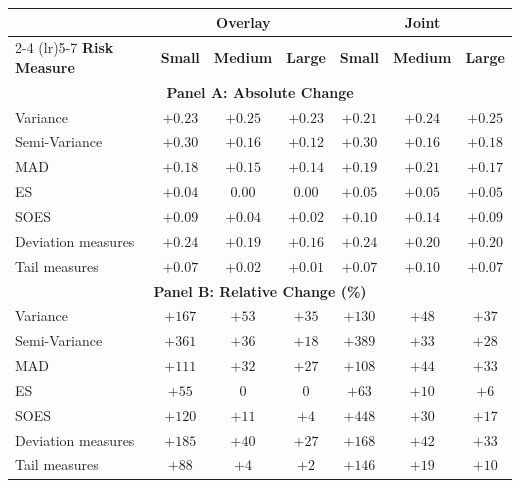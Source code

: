 \begin{table}[htbp]
  \centering
  \setlength{\tabcolsep}{8pt}
  \begin{tabular}{l*{6}{c}}
    \toprule
                          & \multicolumn{3}{c}{\textbf{Overlay}}             & \multicolumn{3}{c}{\textbf{Joint}} \\
    \cmidrule(lr){2-4} \cmidrule(lr){5-7}
    \textbf{Risk Measure} & \textbf{Small} & \textbf{Medium} & \textbf{Large} & \textbf{Small} & \textbf{Medium} & \textbf{Large} \\
    \midrule
    \multicolumn{7}{c}{\textbf{Panel A: Absolute Change}} \\
    \midrule
    Variance              & $+0.23$ & $+0.25$ & $+0.23$ & $+0.21$ & $+0.24$ & $+0.25$ \\
    Semi-Variance         & $+0.30$ & $+0.16$ & $+0.12$ & $+0.30$ & $+0.16$ & $+0.18$ \\
    MAD                   & $+0.18$ & $+0.15$ & $+0.14$ & $+0.19$ & $+0.21$ & $+0.17$ \\
    ES                    & $+0.04$ & $0.00$ & $0.00$ & $+0.05$ & $+0.05$ & $+0.05$ \\
    SOES                  & $+0.09$ & $+0.04$ & $+0.02$ & $+0.10$ & $+0.14$ & $+0.09$ \\
    \midrule
    Deviation measures    & $+0.24$ & $+0.19$ & $+0.16$ & $+0.24$ & $+0.20$ & $+0.20$ \\
    Tail measures         & $+0.07$ & $+0.02$ & $+0.01$ & $+0.07$ & $+0.10$ & $+0.07$ \\
    \midrule
    \multicolumn{7}{c}{\textbf{Panel B: Relative Change (\%)}} \\
    \midrule
    Variance              & $+167$ & $+53$ & $+35$ & $+130$ & $+48$ & $+37$ \\
    Semi-Variance         & $+361$ & $+36$ & $+18$ & $+389$ & $+33$ & $+28$ \\
    MAD                   & $+111$ & $+32$ & $+27$ & $+108$ & $+44$ & $+33$ \\
    ES                    & $+55$ & $0$ & $0$ & $+63$ & $+10$ & $+6$ \\
    SOES                  & $+120$ & $+11$ & $+4$ & $+448$ & $+30$ & $+17$ \\
    \midrule
    Deviation measures    & $+185$ & $+40$ & $+27$ & $+168$ & $+42$ & $+33$ \\
    Tail measures         & $+88$ & $+4$ & $+2$ & $+146$ & $+19$ & $+10$ \\
    \bottomrule
  \end{tabular}

\end{table}
